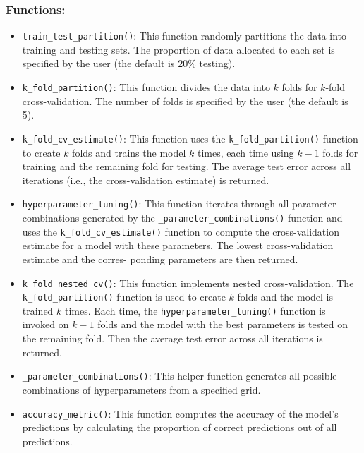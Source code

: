 \documentclass{article}
\begin{document}
\subsubsection*{Functions:}

\begin{itemize}
    \item \texttt{train\_test\_partition()}: 
    This function randomly partitions the data into training and testing sets. The proportion of data allocated to each set is specified by the user (the default is 20\% testing).
    
    \item \texttt{k\_fold\_partition()}:  
    This function divides the data into \( k \) folds for \( k \)-fold cross-validation. The number of folds is specified by the user (the default is 5).
    
    \item \texttt{k\_fold\_cv\_estimate()}:  
    This function uses the \texttt{k\_fold\_partition()} function to create \( k \) folds and trains the model \( k \) times, each time using \( k-1 \) folds for training and the remaining fold for testing. The average test error across all iterations (i.e., the cross-validation estimate) is returned.
    
    \item \texttt{hyperparameter\_tuning()}: 
        This function iterates through all parameter combinations generated by the \texttt{\_parameter\_combinations()} function and uses the \texttt{k\_fold\_cv\_estimate()} function to compute the cross-validation estimate for a model with these parameters. The lowest cross-validation estimate and the corres- ponding parameters are then returned.
        
    \item \texttt{k\_fold\_nested\_cv()}: 
    This function implements nested cross-validation. The \texttt{k\_fold\_partition()} function is used to create \( k \) folds and the model is trained \( k \) times. Each time, the \texttt{hyperparameter\_tuning()} function is invoked on \( k-1 \) folds and the model with the best parameters is tested on the remaining fold. Then the average test error across all iterations is returned.

    \item \texttt{\_parameter\_combinations()}: 
    This helper function generates all possible combinations of hyperparameters from a specified grid.

\item \texttt{accuracy\_metric()}: 
    This function computes the accuracy of the model’s predictions by calculating the proportion of correct predictions out of all predictions.


\end{itemize}
\end{document}
